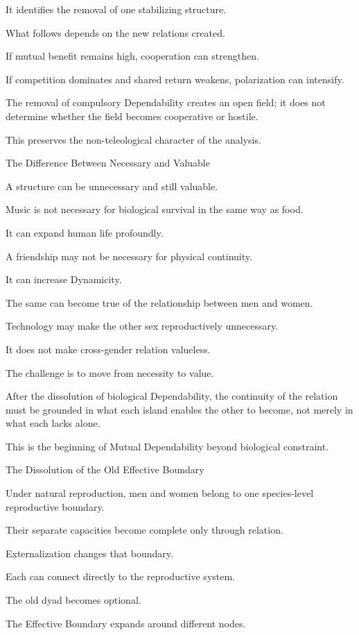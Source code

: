 It identifies the removal of one stabilizing structure.

What follows depends on the new relations created.

If mutual benefit remains high, cooperation can strengthen.

If competition dominates and shared return weakens, polarization can intensify.

The removal of compulsory Dependability creates an open field; it does not determine whether the field becomes cooperative or hostile.

This preserves the non-teleological character of the analysis.

The Difference Between Necessary and Valuable

A structure can be unnecessary and still valuable.

Music is not necessary for biological survival in the same way as food.

It can expand human life profoundly.

A friendship may not be necessary for physical continuity.

It can increase Dynamicity.

The same can become true of the relationship between men and women.

Technology may make the other sex reproductively unnecessary.

It does not make cross-gender relation valueless.

The challenge is to move from necessity to value.

After the dissolution of biological Dependability, the continuity of the relation must be grounded in what each island enables the other to become, not merely in what each lacks alone.

This is the beginning of Mutual Dependability beyond biological constraint.

The Dissolution of the Old Effective Boundary

Under natural reproduction, men and women belong to one species-level reproductive boundary.

Their separate capacities become complete only through relation.

Externalization changes that boundary.

Each can connect directly to the reproductive system.

The old dyad becomes optional.

The Effective Boundary expands around different nodes.

